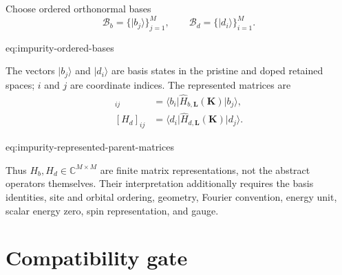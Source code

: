 Choose ordered orthonormal bases
\begin{equation}
    \mathcal B_b=\{\lvert b_j\rangle\}_{j=1}^{M},
    \qquad
    \mathcal B_d=\{\lvert d_i\rangle\}_{i=1}^{M}.
    \label{eq:impurity-ordered-bases}
\end{equation}
\begin{equationterms}{eq:impurity-ordered-bases}
\end{equationterms}
The vectors $\lvert b_j\rangle$ and $\lvert d_i\rangle$ are basis states in the
pristine and doped retained spaces; $i$ and $j$ are coordinate indices. The
represented matrices are
\begin{align}
    [H_b]_{ij}
    &=
    \langle b_i\lvert
    \widehat H_{b,\mathbf L}(\mathbf K)
    \rvert b_j\rangle,
    \\
    [H_d]_{ij}
    &=
    \langle d_i\lvert
    \widehat H_{d,\mathbf L}(\mathbf K)
    \rvert d_j\rangle.
    \label{eq:impurity-represented-parent-matrices}
\end{align}
\begin{equationterms}{eq:impurity-represented-parent-matrices}
\end{equationterms}
Thus $H_b,H_d\in\mathbb C^{M\times M}$ are finite matrix representations, not
the abstract operators themselves. Their interpretation additionally requires
the basis identities, site and orbital ordering, geometry, Fourier convention,
energy unit, scalar energy zero, spin representation, and gauge.

\section{Compatibility gate}

